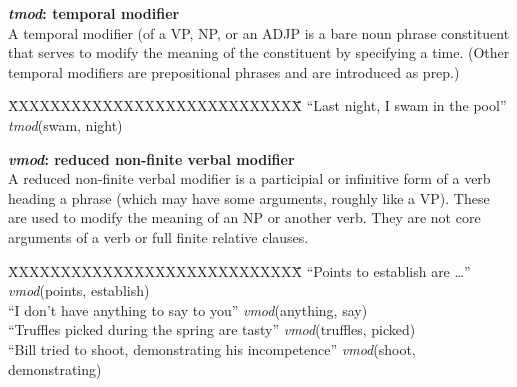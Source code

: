 \documentclass[11pt,letterpaper]{article}
\begin{document}
\noindent\textbf{\emph{tmod}: temporal modifier}\\
A temporal modifier (of a VP, NP, or an ADJP is a bare noun phrase constituent that serves to modify the meaning of the constituent by specifying a time.  (Other temporal modifiers are prepositional phrases and are introduced as prep.)
\begin{tabbing}
\hspace{1cm} \=XXXXXXXXXXXXXXXXXXXXXXXXXXXX\= \hspace{1cm}\=  \kill
\> ``Last night, I swam in the pool'' \> \> \emph{tmod}(swam, night)\\
\end{tabbing}

\noindent\textbf{\emph{vmod}: reduced non-finite verbal modifier}\\
A reduced non-finite verbal modifier is a participial or infinitive
form of a verb heading a phrase (which may have some arguments,
roughly like a VP). These are used to modify the meaning of an NP or
another verb. They are not core arguments of a verb 
or full finite relative clauses.
\begin{tabbing}
\hspace{1cm} \=XXXXXXXXXXXXXXXXXXXXXXXXXXXX\= \hspace{2cm}\=  \kill
\>  ``Points to establish are \ldots'' \> \> \emph{vmod}(points, establish)\\
\> ``I don't have anything to say to you'' \> \> \emph{vmod}(anything, say)\\
\>  ``Truffles picked during the spring are tasty'' \> \> \emph{vmod}(truffles, picked)\\
\>  ``Bill tried to shoot, demonstrating his incompetence'' \> \> \emph{vmod}(shoot, demonstrating)\\
\end{tabbing}
\end{document}
